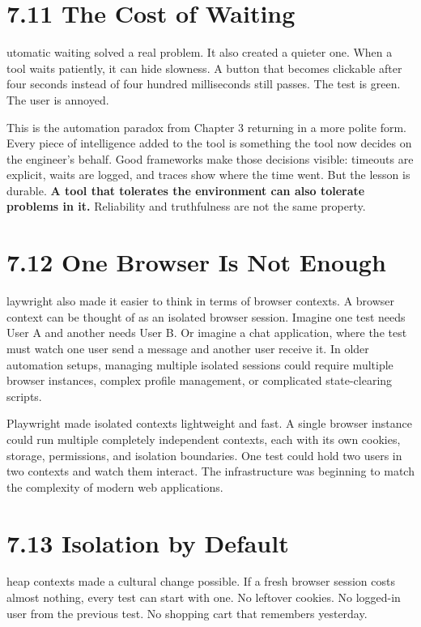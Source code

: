 \documentclass[11pt, a4paper, openany]{book}
\newcommand{\initialcap}[1]{{\fontfamily{lmss}\selectfont\huge\textbf{#1}}}
\begin{document}
\section{7.11 The Cost of Waiting}
\noindent \initialcap{A}utomatic waiting solved a real problem. It also created a quieter one. When a tool waits patiently, it can hide slowness. A button that becomes clickable after four seconds instead of four hundred milliseconds still passes. The test is green. The user is annoyed.

This is the automation paradox from Chapter 3 returning in a more polite form. Every piece of intelligence added to the tool is something the tool now decides on the engineer's behalf. Good frameworks make those decisions visible: timeouts are explicit, waits are logged, and traces show where the time went. But the lesson is durable. \textbf{A tool that tolerates the environment can also tolerate problems in it.} Reliability and truthfulness are not the same property.

\section{7.12 One Browser Is Not Enough}
\noindent \initialcap{P}laywright also made it easier to think in terms of browser contexts. A browser context can be thought of as an isolated browser session. Imagine one test needs User A and another needs User B. Or imagine a chat application, where the test must watch one user send a message and another user receive it. In older automation setups, managing multiple isolated sessions could require multiple browser instances, complex profile management, or complicated state-clearing scripts.

Playwright made isolated contexts lightweight and fast. A single browser instance could run multiple completely independent contexts, each with its own cookies, storage, permissions, and isolation boundaries. One test could hold two users in two contexts and watch them interact. The infrastructure was beginning to match the complexity of modern web applications.

\section{7.13 Isolation by Default}
\noindent \initialcap{C}heap contexts made a cultural change possible. If a fresh browser session costs almost nothing, every test can start with one. No leftover cookies. No logged-in user from the previous test. No shopping cart that remembers yesterday.
\end{document}
